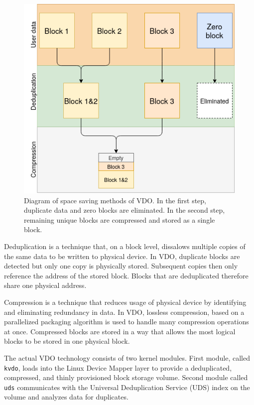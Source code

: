 \documentclass[
  color, %
  table, %
  lof,   %
  lot,   %
]{fithesis3}
\begin{document}
\begin{figure}[!htb]
        \centering
        \includegraphics[width=\textwidth]{graphics/diagrams/space_saving.png}
        \caption[Space saving methods in VDO]{Diagram of space saving methods of VDO. In the first step, duplicate data and zero blocks are eliminated. In the second step, remaining unique blocks are compressed and stored as a single block.}
\label{fig:space_saving}
\end{figure}


Deduplication is a technique that, on a block level, dissalows multiple copies of the same data to be written to physical device. In VDO, duplicate blocks are detected but only one copy is physically stored. Subsequent copies then only reference the address of the stored block. Blocks that are deduplicated therefore share one physical address.

Compression is a technique that reduces usage of physical device by identifying and eliminating redundancy in data. In VDO, lossless compression, based on a parallelized packaging algorithm is used to handle many compression operations at once. Compressed blocks are stored in a way that allows the most logical blocks to be stored in one physical block.

The actual VDO technology consists of two kernel modules. First module, called \texttt{kvdo}, loads into the Linux Device Mapper layer to provide a deduplicated, compressed, and thinly provisioned block storage volume. Second module called \texttt{uds} communicates with the Universal Deduplication Service (UDS) index on the volume and analyzes data for duplicates.
\end{document}
